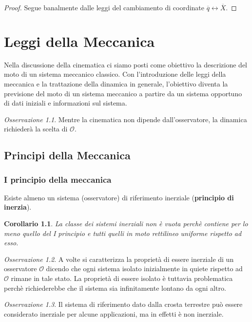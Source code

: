 \documentclass{book}
\theoremstyle{plain}
\theoremstyle{plain}
\theoremstyle{plain}
\theoremstyle{plain}
\newtheorem*{cor}{Corollario}
\theoremstyle{plain}
\theoremstyle{definition}
\theoremstyle{remark}
\newtheorem*{oss}{Osservazione}
\theoremstyle{definition}
\begin{document}
\begin{proof}
    Segue banalmente dalle leggi del cambiamento di coordinate $\overline{q}\leftrightarrow\overline{X}$.
\end{proof}

\chapter{Leggi della Meccanica}

Nella discussione della cinematica ci siamo posti come obiettivo la descrizione del moto di un sistema meccanico classico. Con l'introduzione delle leggi della meccanica e la trattazione della dinamica in generale, l'obiettivo diventa la previsione del moto di un sistema meccanico a partire da un sistema opportuno di dati iniziali e informazioni sul sistema.

\begin{oss}
    Mentre la cinematica non dipende dall'osservatore, la dinamica richiederà la scelta di $\mathcal{O}$.
\end{oss}

\section{Principi della Meccanica}

\subsection*{I principio della meccanica}

Esiste almeno un sistema (osservatore) di riferimento inerziale (\textbf{principio di inerzia}).

\begin{cor}
    La classe dei sistemi inerziali non è vuota perchè contiene per lo meno quello del I principio e tutti quelli in moto rettilineo uniforme rispetto ad esso.
\end{cor}

\begin{oss}
    A volte si caratterizza la proprietà di essere inerziale di un osservatore $\mathcal{O}$ dicendo che ogni sistema isolato inizialmente in quiete rispetto ad $\mathcal{O}$ rimane in tale stato. La proprietà di essere isolato è tuttavia problematica perchè richiederebbe che il sistema sia infinitamente lontano da ogni altro.
\end{oss}

\begin{oss}
    Il sistema di riferimento dato dalla crosta terrestre può essere considerato inerziale per alcune applicazioni, ma in effetti è non inerziale.
\end{oss}
\end{document}
